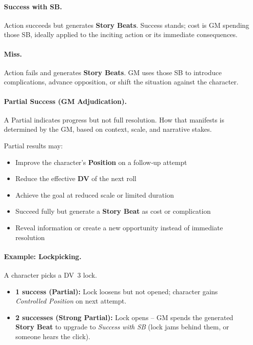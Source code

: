 \paragraph{Success with SB.}
Action succeeds but generates \textbf{Story Beats}. Success stands; cost is GM spending those SB, ideally applied to the inciting action or its immediate consequences.

\paragraph{Miss.}
Action fails and generates \textbf{Story Beats}. GM uses those SB to introduce complications, advance opposition, or shift the situation against the character.

\paragraph{Partial Success (GM Adjudication).}
A Partial indicates progress but not full resolution. How that manifests is determined by the GM, based on context, scale, and narrative stakes.

Partial results may:
\begin{itemize}
  \item Improve the character’s \textbf{Position} on a follow‑up attempt
  \item Reduce the effective \textbf{DV} of the next roll
  \item Achieve the goal at reduced scale or limited duration
  \item Succeed fully but generate a \textbf{Story Beat} as cost or complication
  \item Reveal information or create a new opportunity instead of immediate resolution
\end{itemize}

\paragraph{Example: Lockpicking.}
A character picks a DV~3 lock.
\begin{itemize}
  \item \textbf{1 success (Partial):} Lock loosens but not opened; character gains \emph{Controlled Position} on next attempt.
  \item \textbf{2 successes (Strong Partial):} Lock opens – GM spends the generated \textbf{Story Beat} to upgrade to \emph{Success with SB} (lock jams behind them, or someone hears the click).
\end{itemize}

